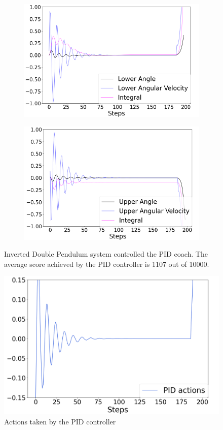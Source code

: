 \documentclass{IJCAS}
\begin{document}
\begin{figure}[H]
\centering
\begin{subfigure}{0.3\textwidth}
\centering
\includegraphics[width=\linewidth]{double_PID.png}
\end{subfigure}
\begin{subfigure}{0.3\textwidth}
\centering
\includegraphics[width=\linewidth]{double_PID_upper.png}
\end{subfigure}
\caption{Inverted Double Pendulum system controlled the PID coach. The average score achieved by the PID controller is 1107 out of 10000. }
\label{fig:double_pid}
\end{figure}

\begin{figure}[H]
\centering
\includegraphics[width=.3\textwidth]{double_PID_actions.png}
\caption{Actions taken by the PID controller}
\label{fig:double_pid_actions}
\end{figure}
\end{document}
